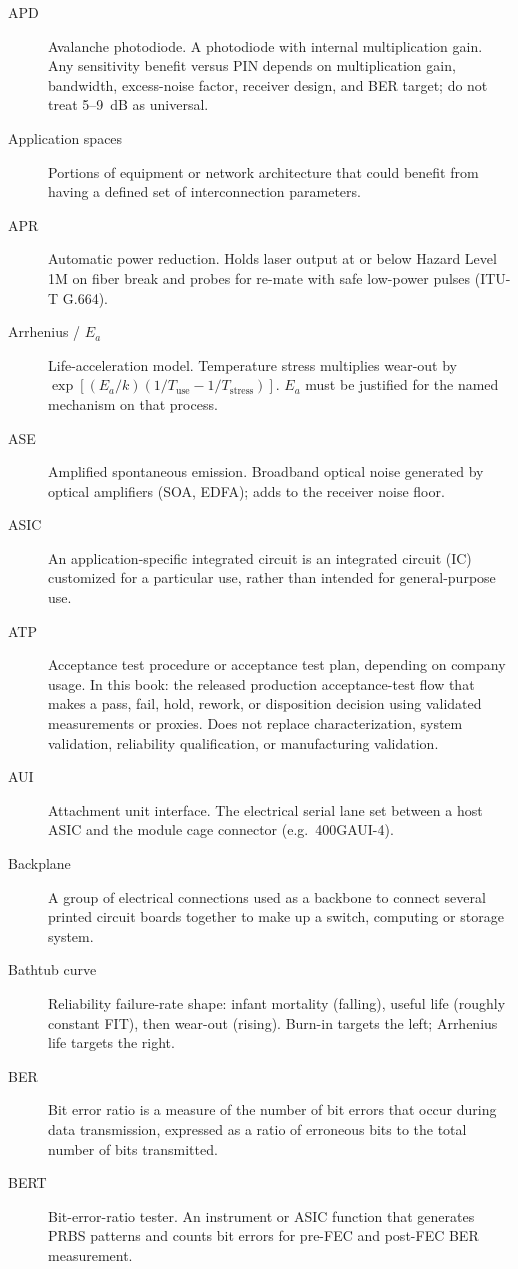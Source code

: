 \begin{description}
\item[APD] Avalanche photodiode. A photodiode with internal multiplication gain. Any sensitivity benefit versus PIN depends on multiplication gain, bandwidth, excess-noise factor, receiver design, and BER target; do not treat 5--9~dB as universal.
\item[Application spaces] Portions of equipment or network architecture that could benefit from having a defined set of interconnection parameters.
\item[APR] Automatic power reduction. Holds laser output at or below Hazard Level 1M on fiber break and probes for re-mate with safe low-power pulses (ITU-T G.664).
\item[Arrhenius / $E_a$] Life-acceleration model. Temperature stress multiplies wear-out by $\exp[(E_a/k)(1/T_\mathrm{use}-1/T_\mathrm{stress})]$. $E_a$ must be justified for the named mechanism on that process.
\item[ASE] Amplified spontaneous emission. Broadband optical noise generated by optical amplifiers (SOA, EDFA); adds to the receiver noise floor.
\item[ASIC] An application-specific integrated circuit is an integrated circuit (IC) customized for a particular use, rather than intended for general-purpose use.
\item[ATP] Acceptance test procedure or acceptance test plan, depending on company usage. In this book: the released production acceptance-test flow that makes a pass, fail, hold, rework, or disposition decision using validated measurements or proxies. Does not replace characterization, system validation, reliability qualification, or manufacturing validation.
\item[AUI] Attachment unit interface. The electrical serial lane set between a host ASIC and the module cage connector (e.g.\ 400GAUI-4).
\item[Backplane] A group of electrical connections used as a backbone to connect several printed circuit boards together to make up a switch, computing or storage system.
\item[Bathtub curve] Reliability failure-rate shape: infant mortality (falling), useful life (roughly constant FIT), then wear-out (rising). Burn-in targets the left; Arrhenius life targets the right.
\item[BER] Bit error ratio is a measure of the number of bit errors that occur during data transmission, expressed as a ratio of erroneous bits to the total number of bits transmitted.
\item[BERT] Bit-error-ratio tester. An instrument or ASIC function that generates PRBS patterns and counts bit errors for pre-FEC and post-FEC BER measurement.

\end{description}
